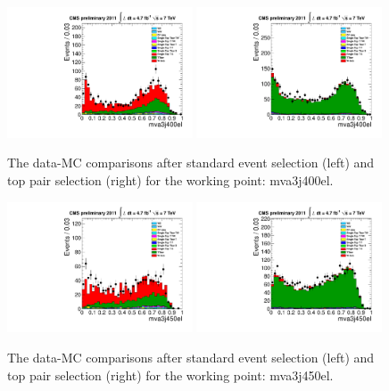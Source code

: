 \begin{figure}[!t]
  \centering
  \includegraphics[width=0.49\textwidth]{figs/cl-mva3j400el-normal.pdf}
  \includegraphics[width=0.49\textwidth]{figs/cl-mva3j400el-inTTbar.pdf}
  \caption{\label{fig:mva:plots-mva3j400el} The data-MC comparisons
    after standard event selection (left) and top pair
    selection (right) for the working point: mva3j400el.}
\end{figure}

\begin{figure}[!t]
  \centering
  \includegraphics[width=0.49\textwidth]{figs/cl-mva3j450el-normal.pdf}
  \includegraphics[width=0.49\textwidth]{figs/cl-mva3j450el-inTTbar.pdf}
  \caption{\label{fig:mva:plots-mva3j450el} The data-MC comparisons
    after standard event selection (left) and top pair
    selection (right) for the working point: mva3j450el.}
\end{figure}

